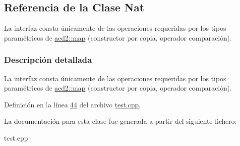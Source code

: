 \hypertarget{classNat}{}\subsection{Referencia de la Clase Nat}
\label{classNat}


La interfaz consta únicamente de las operaciones requeridas por los tipos paramétricos de \hyperlink{classaed2_1_1map}{aed2\+::map} (constructor por copia, operador comparación).  




\subsubsection{Descripción detallada}
La interfaz consta únicamente de las operaciones requeridas por los tipos paramétricos de \hyperlink{classaed2_1_1map}{aed2\+::map} (constructor por copia, operador comparación). 

Definición en la línea \hyperlink{test_8cpp_source_l00044}{44} del archivo \hyperlink{test_8cpp_source}{test.\+cpp}.



La documentación para esta clase fue generada a partir del siguiente fichero\+:\begin{DoxyCompactItemize}
\item 
test.\+cpp\end{DoxyCompactItemize}
